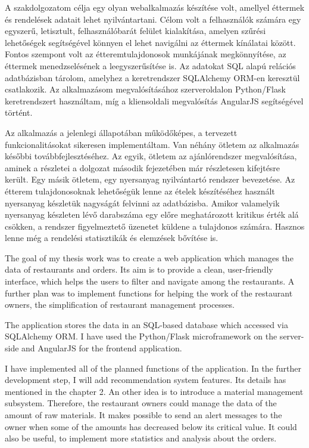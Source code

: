 
A szakdolgozatom célja egy olyan webalkalmazás készítése volt, amellyel éttermek és rendelések adatait lehet nyilvántartani. Célom volt a felhasználók számára egy egyszerű, letisztult, felhasználóbarát felület kialakítása, amelyen szűrési lehetőségek segítségével könnyen el lehet navigálni az éttermek kínálatai között. Fontos szempont volt az étteremtulajdonosok munkájának megkönnyítése, az éttermek menedzselésének a leegyszerűsítése is. Az adatokat SQL alapú relációs adatbázisban tárolom, amelyhez a keretrendszer SQLAlchemy ORM-en keresztül csatlakozik. Az alkalmazásom megvalósításához szerveroldalon Python/Flask keretrendszert használtam, míg a kliensoldali megvalósítás AngularJS segítségével történt.

Az alkalmazás a jelenlegi állapotában működőképes, a tervezett funkcionalitásokat sikeresen implementáltam. Van néhány ötletem az alkalmazás későbbi továbbfejlesztéséhez. Az egyik, ötletem az ajánlórendszer megvalósítása, aminek a részletei a dolgozat második fejezetében már részletesen kifejtésre került. Egy másik ötletem, egy nyersanyag nyilvántartó rendszer bevezetése. Az étterem tulajdonosoknak lehetőségük lenne az ételek készítéséhez használt nyersanyag készletük nagyságát felvinni az adatbázisba. Amikor valamelyik nyersanyag készleten lévő darabszáma egy előre meghatározott kritikus érték alá csökken, a rendszer figyelmeztető üzenetet küldene a tulajdonos számára. Hasznos lenne még a rendelési statisztikák és elemzések bővítése is.


The goal of my thesis work was to create a web application which manages the data of restaurants and orders. Its aim is to provide a clean, user-friendly interface, which helps the users to filter and navigate among the restaurants. A further plan was to implement functions for helping the work of the restaurant owners, the simplification of restaurant management processes.

The application stores the data in an SQL-based database which accessed via SQLAlchemy ORM. I have used the Python/Flask microframework on the server-side and AngularJS for the frontend application.

I have implemented all of the planned functions of the application. In the further development step, I will add recommendation system features. Its details has mentioned in the chapter 2. An other idea is to introduce a material management subsystem. Therefore, the restaurant owners could manage the data of the amount of raw materials. It makes possible to send an alert messages to the owner when some of the amounts has decreased below its critical value. It could also be useful, to implement more statistics and analysis about the orders.
